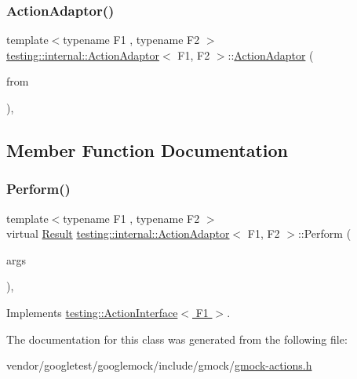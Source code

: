 \subsubsection{\texorpdfstring{Action\+Adaptor()}{ActionAdaptor()}}
{\footnotesize\ttfamily template$<$typename F1 , typename F2 $>$ \\
\hyperlink{classtesting_1_1internal_1_1_action_adaptor}{testing\+::internal\+::\+Action\+Adaptor}$<$ F1, F2 $>$\+::\hyperlink{classtesting_1_1internal_1_1_action_adaptor}{Action\+Adaptor} (\begin{DoxyParamCaption}\item[{const \hyperlink{classtesting_1_1_action}{Action}$<$ F2 $>$ \&}]{from }\end{DoxyParamCaption})\hspace{0.3cm}{\ttfamily [inline]}, {\ttfamily [explicit]}}



\subsection{Member Function Documentation}
\mbox{\label{classtesting_1_1internal_1_1_action_adaptor_a8d8a47a31f068cf6e0c95b91605d5540}} 
\subsubsection{\texorpdfstring{Perform()}{Perform()}}
{\footnotesize\ttfamily template$<$typename F1 , typename F2 $>$ \\
virtual \hyperlink{classtesting_1_1internal_1_1_action_adaptor_afa8f7872b6db3d8f1545fd98b45b0b95}{Result} \hyperlink{classtesting_1_1internal_1_1_action_adaptor}{testing\+::internal\+::\+Action\+Adaptor}$<$ F1, F2 $>$\+::Perform (\begin{DoxyParamCaption}\item[{const \hyperlink{classtesting_1_1internal_1_1_action_adaptor_a4f78fb73f97b72fea8a93b78a8ab5704}{Argument\+Tuple} \&}]{args }\end{DoxyParamCaption})\hspace{0.3cm}{\ttfamily [inline]}, {\ttfamily [virtual]}}



Implements \hyperlink{classtesting_1_1_action_interface_a20f8624fcea1786f2992b358760422a0}{testing\+::\+Action\+Interface$<$ F1 $>$}.



The documentation for this class was generated from the following file\+:\begin{DoxyCompactItemize}
\item 
vendor/googletest/googlemock/include/gmock/\hyperlink{gmock-actions_8h}{gmock-\/actions.\+h}\end{DoxyCompactItemize}
